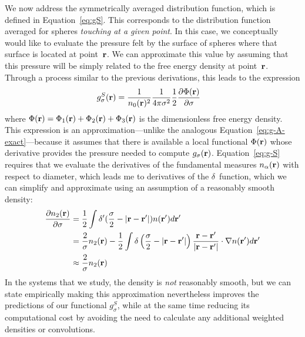 We now address the symmetrically averaged distribution function, which
is defined in Equation~\ref{eq:gS}.  This corresponds to the
distribution function averaged for spheres \emph{touching at a given
  point}.  In this case, we conceptually would like to evaluate the
pressure felt by the surface of spheres where that surface is located
at point~$\textbf{r}$.  We can approximate this value by assuming that this
pressure will be simply related to the free energy density at
point~$\textbf{r}$.  Through a process similar to the previous derivations, this
leads to the expression
\begin{align}
  g_\sigma^S(\rr)%
  &= \frac{1}{n_0(\rr)^2}\frac{1}{ 4\pi \sigma^2}\frac12
  \frac{\partial \Phi(\rr)}{\partial \sigma} \label{eq:g-S}
\end{align}
where $\Phi(\textbf{r}) = \Phi_1(\textbf{r}) + \Phi_2(\textbf{r}) + \Phi_3(\textbf{r})$ is the
dimensionless free energy density.  This expression is an
approximation---unlike the analogous
Equation~\ref{eq:g-A-exact}---because it assumes that there is
available a local functional $\Phi(\textbf{r})$ whose derivative provides the
pressure needed to compute $g_\sigma(\textbf{r})$.  Equation~\ref{eq:g-S}
requires that we evaluate the derivatives of the fundamental measures
$n_\alpha(\textbf{r})$ with respect to diameter, which leads me to
derivatives of the $\delta$~function, which we can simplify and
approximate using an assumption of a reasonably smooth density:
\begin{align}
  \frac{\partial n_2(\textbf{r})}{\partial \sigma}
  &= \frac12 \int \delta'(\frac\sigma2 - |\textbf{r}-\textbf{r}'|) n(\textbf{r}')d\textbf{r}' \\
  &= \frac2{\sigma}n_2(\textbf{r}) - \frac12 \int \delta\left(\frac\sigma2 - |\textbf{r}-\textbf{r}'|\right)
  \frac{\textbf{r}-\textbf{r}'}{|\textbf{r}-\textbf{r}'|}\cdot\mathbf{\nabla}n(\textbf{r}')d\textbf{r}' \\
  &\approx \frac{2}{\sigma}n_2(\textbf{r})
\end{align}
In the systems that we study, the density is \emph{not} reasonably
smooth, but we can state empirically making this approximation
nevertheless improves the predictions of our functional $g_\sigma^S$, while at the
same time reducing its computational cost by avoiding the need to
calculate any additional weighted densities or convolutions.

